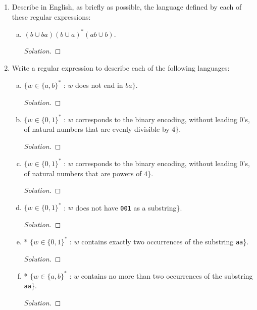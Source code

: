 \documentclass[10pt]{article}
\begin{document}
\begin{enumerate}[1)]

\item
Describe in English, as briefly as possible, the language defined by each of these regular expressions:
\begin{enumerate}[a)]
\item
$(b \cup ba) (b \cup a)^* (ab \cup b)$.
\begin{proof}[Solution]
\end{proof}

\end{enumerate}


\item
Write a regular expression to describe each of the following languages:
\begin{enumerate}[a)]
\addtocounter{enumii}{1}
\item
$\{w \in \{a, b\}^*$ : $w$ does not end in $ba\}$.
\begin{proof}[Solution]
\end{proof}

\addtocounter{enumii}{1}
\item
$\{w \in \{0, 1\}^*$ : $w$ corresponds to the binary encoding, without leading $0$'s, of natural numbers that are evenly divisible by $4\}$.
\begin{proof}[Solution]
\end{proof}
\item
$\{w \in \{0, 1\}^*$ : $w$ corresponds to the binary encoding, without leading $0$'s, of natural numbers that are powers of $4\}$.
\begin{proof}[Solution]
\end{proof}
\addtocounter{enumii}{2}
\item
$\{w \in \{0, 1\}^*$ : $w$ does not have \texttt{001} as a substring\}.
\begin{proof}[Solution]
\end{proof}
\addtocounter{enumii}{7}
\item
* $\{w \in \{0, 1\}^*$ : $w$ contains exactly two occurrences of the substring \texttt{aa}\}.
\begin{proof}[Solution]
\end{proof}
\item
* $\{w \in \{a, b\}^*$ : $w$ contains no more than two occurrences of the substring \texttt{aa}\}.
\begin{proof}[Solution]
\end{proof}
\end{enumerate}


\end{enumerate}
\end{document}
